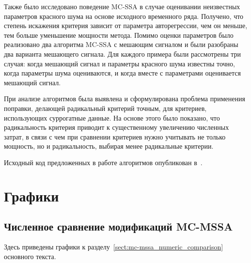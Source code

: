 \documentclass[specialist,
substylefile = spbu.rtx,
               subf,href,colorlinks=true, 12pt]{disser}
\theoremstyle{definition}
\begin{document}
Также было исследовано поведение MC-SSA в случае оценивании неизвестных параметров красного шума на основе исходного временного ряда. Получено, что степень искажения критерия зависит от параметра авторегрессии, чем он меньше, тем больше уменьшение мощности метода. Помимо оценки параметров было реализовано два алгоритма MC-SSA с мешающим сигналом и были разобраны два варианта мешающего сигнала. Для каждого примера были рассмотрены три случая: когда мешающий сигнал и параметры красного шума известны точно, когда параметры шума оцениваются, и когда вместе с параметрами оценивается мешающий сигнал.

При анализе алгоритмов была выявлена и сформулирована проблема применения поправки, делающей радикальный критерий точным, для критериев, использующих суррогатные данные. На основе этого было показано, что радикальность критерия приводит к существенному увеличению численных затрат, в связи с чем при сравнении критериев нужно учитывать не только мощность, но и радикальность, выбирая менее радикальные критерии.

Исходный код предложенных в работе алгоритмов опубликован в~\cite{Poteshkin_2024}.




\appendix

\chapter{Графики}
\section{Численное сравнение модификаций MC-MSSA}\label{appendix:mc-mssa_graphs}
Здесь приведены графики к разделу~\ref{sect:mc-mssa_numeric_comparison} основного текста.
\end{document}
